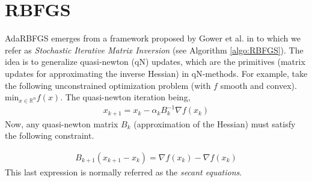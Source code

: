 \documentclass[12pt,conference,compsocconf]{IEEEtran}
\newcommand{\R}{\mathbb{R}}
\begin{document}
\section{RBFGS}\label{sect:rbfgs}
AdaRBFGS emerges from a framework proposed by Gower et al. in \cite{Gower1,Gower2} to which we refer as \textit{Stochastic Iterative Matrix Inversion} (see Algorithm \ref{algo:RBFGS}). The idea is to generalize quasi-newton (qN) updates, which are the primitives (matrix updates for approximating the inverse Hessian) in qN-methods. For example, take the following unconstrained optimization problem (with $f$ smooth and convex).
$\text{min}_{x \in \R^n} f(x)$. The quasi-newton iteration being, 
\begin{align}\label{eq:qnmethod}
x_{k+1}=x_k-\alpha_kB_k^{-1}\nabla f(x_k)
\end{align}
Now, any quasi-newton matrix $B_k$ (approximation of the Hessian) must satisfy the following constraint.

\begin{align}\label{eq:secant}
B_{k+1}(x_{k+1}-x_k)=\nabla f(x_k)-\nabla f(x_k)
\end{align}
This last expression is normally referred as the \textit{secant equations}.
\vspace{-4mm}
\end{document}
